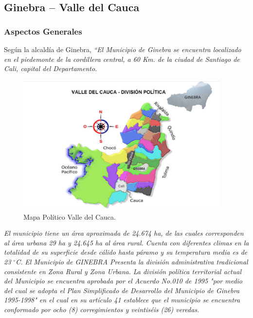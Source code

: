 \documentclass[12pt,letterpaper,openany]{book}
\newcommand{\grad}{$^{\circ}$}
\begin{document}
\subsection{Ginebra – Valle del Cauca}
\subsubsection{Aspectos Generales}
Según la alcaldía de Ginebra, \textit{``El Municipio de Ginebra se encuentra localizado en el piedemonte de la cordillera central, a 60 Km. de la ciudad de Santiago de Cali, capital del Departamento}.

\begin{figure}[H]
\begin{center}
\includegraphics[width=10.7cm]{./imagenes/mapa_politico}
\caption{Mapa Político Valle del Cauca. \cite{4}}
\end{center}
\end{figure}

\textit{El municipio tiene un área aproximada de 24.674 ha, de las cuales corresponden al área urbana 29 ha y 24.645 ha al área rural. Cuenta con diferentes climas en la totalidad de su superficie desde cálido hasta páramo y su temperatura media es de 23 \grad C.}
\vspace{5mm}\newline
\textit{El Municipio de GINEBRA Presenta la división administrativa tradicional consistente en Zona Rural y Zona Urbana.}
\vspace{5mm}\newline	
\textit{La división política territorial actual del Municipio se encuentra aprobada por el Acuerdo No.010 de 1995 "por medio del cual se adopta el Plan Simplificado de Desarrollo del Municipio de Ginebra 1995-1998" en el cual en su artículo 41 establece que el municipio se encuentra conformado por ocho (8) corregimientos y veintiséis (26) veredas.}
\end{document}
